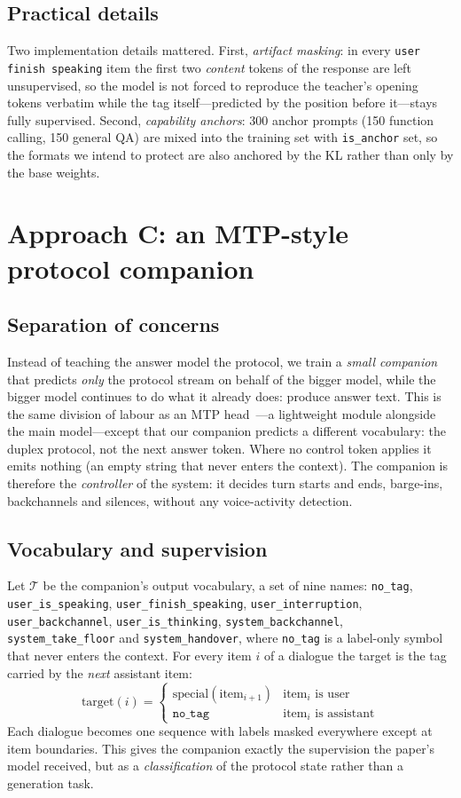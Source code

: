 \documentclass[conference]{IEEEtran}
\begin{document}
\subsection{Practical details}
Two implementation details mattered. First, \emph{artifact masking}: in every
\texttt{user finish speaking} item the first two \emph{content} tokens of the
response are left unsupervised, so the model is not forced to reproduce the
teacher's opening tokens verbatim while the tag itself---predicted by the
position before it---stays fully supervised. Second, \emph{capability anchors}:
300 anchor prompts (150 function calling, 150 general QA) are mixed into the
training set with \texttt{is\_anchor} set, so the formats we intend to protect are
also anchored by the KL rather than only by the base weights.

\section{Approach C: an MTP-style protocol companion}
\label{sec:companion}

\subsection{Separation of concerns}
Instead of teaching the answer model the protocol, we train a \emph{small
companion} that predicts \emph{only} the protocol stream on behalf of the bigger
model, while the bigger model continues to do what it already does: produce answer
text. This is the same division of labour as an MTP
head~\cite{deepseek}---a lightweight module alongside the main model---except
that our companion predicts a different vocabulary: the duplex protocol, not the
next answer token. Where no control token applies it emits nothing (an empty
string that never enters the context). The companion is therefore the
\emph{controller} of the system: it decides turn starts and ends, barge-ins,
backchannels and silences, without any voice-activity detection.

\subsection{Vocabulary and supervision}
Let $\mathcal{T}$ be the companion's output vocabulary, a set of nine names:
\texttt{no\_tag}, \texttt{user\_is\_speaking}, \texttt{user\_finish\_speaking},
\texttt{user\_interruption}, \texttt{user\_backchannel},
\texttt{user\_is\_thinking}, \texttt{system\_backchannel},
\texttt{system\_take\_floor} and \texttt{system\_handover}, where
\texttt{no\_tag} is a label-only symbol that never enters the context. For every item $i$ of a dialogue the target is the tag
carried by the \emph{next} assistant item:
\[
\text{target}(i) = \begin{cases}
  \text{special}(\text{item}_{i+1}) & \text{item}_i \text{ is user}\\
  \texttt{no\_tag} & \text{item}_i \text{ is assistant}
\end{cases}
\]
Each dialogue becomes one sequence with labels masked everywhere except at item
boundaries. This gives the companion exactly the supervision the paper's model
received, but as a \emph{classification} of the protocol state rather than a
generation task.
\end{document}
